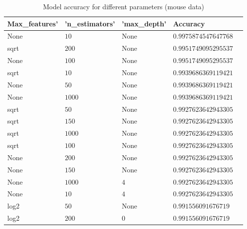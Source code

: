 \documentclass[
    fontsize=12pt,
    headings=small,
    parskip=half,           %
    bibliography=totoc,
    numbers=noenddot,       %
    open=any,               %
    final                   %
]{scrreprt}
\begin{document}
\begin{table}[h!]
\centering
\caption{Model accuracy for different parameters (mouse data)}
\label{table:mouse_params}
\begin{tabular}{|l|l|l|l|l}
\hline
Max\_features' & 'n\_estimators' & 'max\_depth' & Accuracy \\
\hline
None          & $ 10$           & None         & $ 0.9975874547647768$ \\
sqrt          & $ 200$          & None         & $ 0.9951749095295537$ \\
None          & $ 100$          & None         & $ 0.9951749095295537$ \\
sqrt          & $ 10$           & None         & $ 0.9939686369119421$ \\
None          & $ 50$           & None         & $ 0.9939686369119421$ \\
None          & $ 1000$         & None         & $ 0.9939686369119421$ \\
sqrt          & $ 50$           & None         & $ 0.9927623642943305$ \\
sqrt          & $ 150$          & None         & $ 0.9927623642943305$ \\
sqrt          & $ 1000$         & None         & $ 0.9927623642943305$ \\
sqrt          & $ 100$          & None         & $ 0.9927623642943305$ \\
None          & $ 200$          & None         & $ 0.9927623642943305$ \\
None          & $ 150$          & None         & $ 0.9927623642943305$ \\
None          & $ 1000$         & $ 4$         & $ 0.9927623642943305$ \\
None          & $ 10$           & $ 4$         & $ 0.9927623642943305$ \\
log2          & $ 50$           & None         & $ 0.991556091676719$ \\
log2          & $ 200$          & $ 0$         & $ 0.991556091676719$ \\
\hline
\end{tabular}
\end{table}
\end{document}
